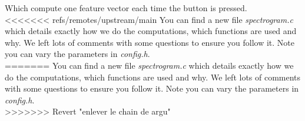 %
Which compute one feature vector each time the button is pressed. \\
<<<<<<< refs/remotes/upstream/main
You can find a new file \emph{spectrogram.c} which details exactly how we do the computations, which functions are used and why. We left lots of comments with some questions to ensure you follow it. Note you can vary the parameters in \emph{config.h}. \\
=======
You can find a new file \emph{spectrogram.c} which details exactly how we do the computations, which functions are used and why. We left lots of comments with some questions to ensure you follow it. Note you can vary the parameters in \emph{config.h}.  \\
>>>>>>> Revert "enlever le chain de argu"
\\

